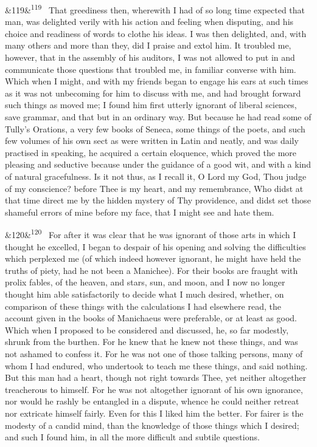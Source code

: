 \documentclass[12pt]{article}
\newcommand{\para}[1][]{\par\noindent\ifx&#1&\else\textsuperscript{\footnotesize #1}~\fi}
\begin{document}
\para[119] That greediness then, wherewith I had of so long time expected that man, was delighted verily with his action and feeling when disputing, and his choice and readiness of words to clothe his ideas. I was then delighted, and, with many others and more than they, did I praise and extol him. It troubled me, however, that in the assembly of his auditors, I was not allowed to put in and communicate those questions that troubled me, in familiar converse with him. Which when I might, and with my friends began to engage his ears at such times as it was not unbecoming for him to discuss with me, and had brought forward such things as moved me; I found him first utterly ignorant of liberal sciences, save grammar, and that but in an ordinary way. But because he had read some of Tully's Orations, a very few books of Seneca, some things of the poets, and such few volumes of his own sect as were written in Latin and neatly, and was daily practised in speaking, he acquired a certain eloquence, which proved the more pleasing and seductive because under the guidance of a good wit, and with a kind of natural gracefulness. Is it not thus, as I recall it, O Lord my God, Thou judge of my conscience? before Thee is my heart, and my remembrance, Who didst at that time direct me by the hidden mystery of Thy providence, and didst set those shameful errors of mine before my face, that I might see and hate them.

\para[120] For after it was clear that he was ignorant of those arts in which I thought he excelled, I began to despair of his opening and solving the difficulties which perplexed me (of which indeed however ignorant, he might have held the truths of piety, had he not been a Manichee). For their books are fraught with prolix fables, of the heaven, and stars, sun, and moon, and I now no longer thought him able satisfactorily to decide what I much desired, whether, on comparison of these things with the calculations I had elsewhere read, the account given in the books of Manichaeus were preferable, or at least as good. Which when I proposed to be considered and discussed, he, so far modestly, shrunk from the burthen. For he knew that he knew not these things, and was not ashamed to confess it. For he was not one of those talking persons, many of whom I had endured, who undertook to teach me these things, and said nothing. But this man had a heart, though not right towards Thee, yet neither altogether treacherous to himself. For he was not altogether ignorant of his own ignorance, nor would he rashly be entangled in a dispute, whence he could neither retreat nor extricate himself fairly. Even for this I liked him the better. For fairer is the modesty of a candid mind, than the knowledge of those things which I desired; and such I found him, in all the more difficult and subtile questions.
\end{document}
